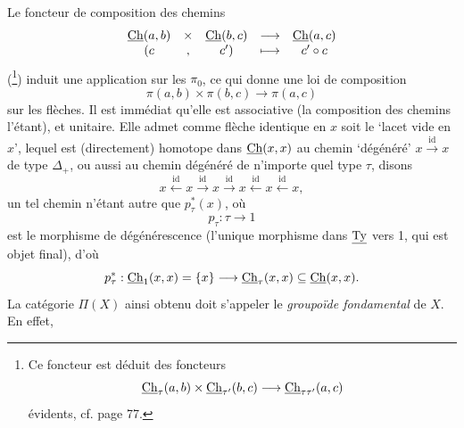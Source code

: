 Le foncteur de composition des chemins
\[
\begin{array}{ccccc}
\underline{\mathrm{Ch}}(a,b) & \times & \underline{\mathrm{Ch}}(b,c) & \longrightarrow & \underline{\mathrm{Ch}}(a,c)\\
(c & , & c') & \longmapsto & c' \circ c
\end{array}
\]
 (\footnote[17]{Ce foncteur est déduit des foncteurs
\[
\underline{\mathrm{Ch}}_\tau(a,b) \times \underline{\mathrm{Ch}}_{\tau'}(b,c) \longrightarrow \underline{\mathrm{Ch}}_{\tau\tau'}(a,c)
\]
évidents, cf. page 77.}) induit une application sur les $\pi_0$, ce qui donne une loi de composition
\[
\pi(a,b) \times \pi(b,c) \longrightarrow \pi(a,c)
\]
sur les flèches. Il est immédiat qu'elle est associative (la composition des chemins l'étant), et unitaire. Elle admet comme flèche identique en $x$ soit le `lacet vide en $x$', lequel est (directement) homotope dans $\underline{\mathrm{Ch}}(x,x)$ au chemin `dégénéré' $x \xrightarrow{\mathrm{id}} x$
de type $\Delta_+$, ou aussi au chemin dégénéré de n'importe quel type $\tau$, disons
\[
x \xleftarrow{\mathrm{id}} x \xrightarrow{\mathrm{id}} x \xrightarrow{\mathrm{id}} x \xleftarrow{\mathrm{id}} x \xleftarrow{\mathrm{id}} x,
\]
un tel chemin n'étant autre que $p_\tau^*(x)$, où
\[
p_\tau : \tau \longrightarrow 1
\]
est le morphisme de dégénérescence (l'unique morphisme dans $\underline{\mathrm{Ty}}$ vers 1, qui est objet final), d'où
\[
p_\tau^* : \underline{\mathrm{Ch}}_1(x,x) = \{x\} \longrightarrow \underline{\mathrm{Ch}}_\tau(x,x) \subseteq \underline{\mathrm{Ch}}(x,x).
\]
La catégorie $\Pi(X)$ ainsi obtenu doit s'appeler le \textit{groupoïde fondamental} de $X$. En effet, %

